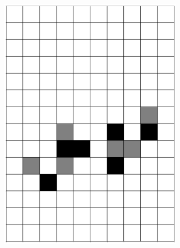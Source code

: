\documentclass[12pt]{article}
\numberwithin{figure}{section} %
\begin{document}
\begin{figure}[htbp]
	\begin{subfigure}{0.23\textwidth}
     		\centering
     		\includegraphics[width=\linewidth]{Section4/37.0}
     		\subcaption{}
   	\end{subfigure}
    	\begin{subfigure}{0.23\textwidth}
     		\centering

\end{subfigure}
\end{figure}
\end{document}
